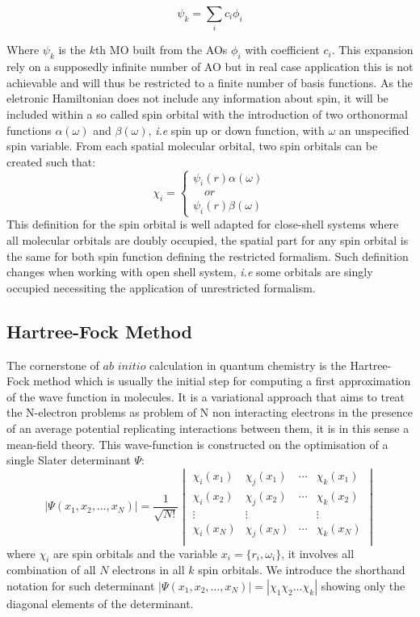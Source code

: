\documentclass[10pt]{report}
\numberwithin{equation}{section}
\begin{document}
\begin{equation}
    \psi_k=\sum_{i}c_i \phi_i
\end{equation}

Where $\psi_k$ is the $k$th MO built from the AOs $\phi_i$ with coefficient $c_i$. 
This expansion rely on a supposedly infinite number of AO but in real case application this is not achievable and will thus be restricted to a finite number of basis functions.
As the eletronic Hamiltonian does not include any information about spin, it will be included within a so called spin orbital with the introduction of two orthonormal functions $\alpha(\omega)$ and $\beta(\omega)$, \textit{i.e} spin up or down function, with $\omega$ an unspecified spin variable.
From each spatial molecular orbital, two spin orbitals can be created such that:
\begin{equation}
    \chi_i=\begin{cases}
    \psi_i(r)\alpha(\omega)\\
    \quad or \\
    \psi_i(r)\beta(\omega)
    \end{cases}
\end{equation}
This definition for the spin orbital is well adapted for close-shell systems where all molecular orbitals are doubly occupied, the spatial part for any spin orbital is the same for both spin function defining the restricted formalism.
Such definition changes when working with open shell system, \textit{i.e} some orbitals are singly occupied  necessiting the application of unrestricted formalism.


\subsection{Hartree-Fock Method}
The cornerstone of $ab$ $initio$ calculation in quantum chemistry is the Hartree-Fock method which is usually the initial step for computing a first approximation of the wave function in molecules. 
It is a variational approach that aims to treat the N-electron problems as problem of N non interacting electrons in the presence of an average potential replicating interactions between them, it is in this sense a mean-field theory.
This wave-function is constructed on the optimisation of a single Slater determinant $\Psi$:
\begin{equation}
    |\Psi(x_1,x_2,\ldots,x_N)|=\frac{1}{\sqrt{N!}}
    \begin{vmatrix}
        \chi_i (x_1) & \chi_j (x_1) & \cdots & \chi_k (x_1)\\
        \chi_i (x_2) & \chi_j (x_2) & \cdots & \chi_k (x_2)\\
        \vdots & \vdots &   &  \vdots\\
        \chi_i (x_N) & \chi_j (x_N) & \cdots & \chi_k (x_N)\\
    \end{vmatrix}
\end{equation}
where $\chi_i$ are spin orbitals and the variable $x_i=\{r_i,\omega_i\}$, it involves all combination of all $N$ electrons in all $k$ spin orbitals. 
We introduce the shorthand notation for such determinant $|\Psi(x_1,x_2,\ldots,x_N)|=|\chi_1\chi_2\ldots\chi_k|$ showing only the diagonal elements of the determinant.
\end{document}
